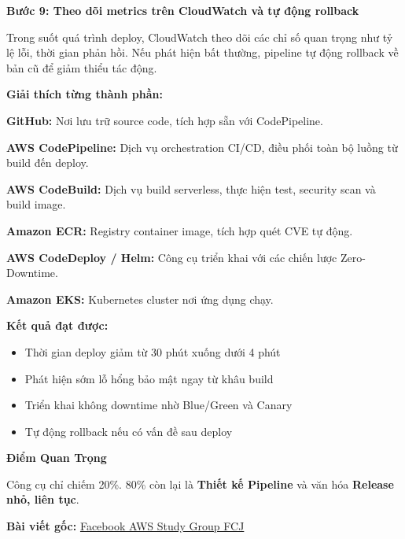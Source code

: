 \textbf{Bước 9: Theo dõi metrics trên CloudWatch và tự động rollback}

Trong suốt quá trình deploy, CloudWatch theo dõi các chỉ số quan trọng
như tỷ lệ lỗi, thời gian phản hồi. Nếu phát hiện bất thường, pipeline tự
động rollback về bản cũ để giảm thiểu tác động.

\vspace{0.5em}\noindent\textbf{Giải thích từng thành
phần:}\par

\textbf{GitHub:} Nơi lưu trữ source code, tích hợp sẵn với CodePipeline.

\textbf{AWS CodePipeline:} Dịch vụ orchestration CI/CD, điều phối toàn
bộ luồng từ build đến deploy.

\textbf{AWS CodeBuild:} Dịch vụ build serverless, thực hiện test,
security scan và build image.

\textbf{Amazon ECR:} Registry container image, tích hợp quét CVE tự
động.

\textbf{AWS CodeDeploy / Helm:} Công cụ triển khai với các chiến lược
Zero-Downtime.

\textbf{Amazon EKS:} Kubernetes cluster nơi ứng dụng chạy.

\vspace{0.5em}\noindent\textbf{Kết quả đạt
được:}\par

\begin{itemize}
\tightlist
\item
  Thời gian deploy giảm từ 30 phút xuống dưới 4 phút
\item
  Phát hiện sớm lỗ hổng bảo mật ngay từ khâu build
\item
  Triển khai không downtime nhờ Blue/Green và Canary
\item
  Tự động rollback nếu có vấn đề sau deploy
\end{itemize}

\vspace{0.5em}\noindent\textbf{Điểm Quan Trọng}\par

Công cụ chỉ chiếm 20\%. 80\% còn lại là \textbf{Thiết kế Pipeline} và
văn hóa \textbf{Release nhỏ, liên tục}.

\textbf{Bài viết gốc:}
\href{https://www.facebook.com/groups/awsstudygroupfcj/permalink/2229176364513990/?rdid=aT7nNGRCmytCuj4K\#}{Facebook
AWS Study Group FCJ}
